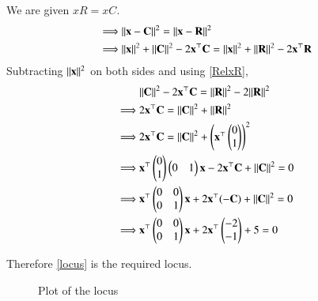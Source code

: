 \documentclass[journal,12pt,twocolumn]{IEEEtran}
\begin{document}
We are given $xR = xC$.  
\begin{align}
    \implies &\lVert\mathbf{x} - \mathbf{C}\rVert^2 = \lVert\mathbf{x} - \mathbf{R}\rVert^2\\ 
    \implies &\lVert\mathbf{x}\rVert^2+\lVert\mathbf{C}\rVert^2-2\mathbf{x}^\top \mathbf{C} = \lVert\mathbf{x}\rVert^2+\lVert\mathbf{R}\rVert^2-2\mathbf{x}^\top \mathbf{R}
\end{align}
Subtracting $\lVert\mathbf{x}\rVert^2$ on both sides and using \ref{RelxR},
\begin{align}
    &\lVert\mathbf{C}\rVert^2-2\mathbf{x}^\top \mathbf{C} = \lVert\mathbf{R}\rVert^2 - 2\lVert\mathbf{R}\rVert^2\\
    \implies &2\mathbf{x}^\top \mathbf{C} = \lVert\mathbf{C}\rVert^2+\lVert\mathbf{R}\rVert^2\\
    \implies &2\mathbf{x}^\top \mathbf{C} = \lVert\mathbf{C}\rVert^2+\begin{pmatrix}\mathbf{x}^\top \begin{pmatrix}0\\1\end{pmatrix}\end{pmatrix}^2\\
    \implies &\mathbf{x}^\top \begin{pmatrix}0\\1\end{pmatrix} \begin{pmatrix}0 & 1\end{pmatrix} \mathbf{x} - 2\mathbf{x}^\top \mathbf{C} + \lVert\mathbf{C}\rVert^2 = 0\\
    \implies &\mathbf{x}^\top \begin{pmatrix}0&0\\0&1\end{pmatrix}\mathbf{x} + 2\mathbf{x}^\top(- \mathbf{C}) + \lVert\mathbf{C}\rVert^2 = 0\\
    \implies &\mathbf{x}^\top \begin{pmatrix}0&0\\0&1\end{pmatrix}\mathbf{x} + 2\mathbf{x}^\top\begin{pmatrix}-2\\-1\end{pmatrix} + 5 = 0\label{locus}
\end{align}

Therefore \ref{locus} is the required locus. 
\begin{figure}
    \centering
    \caption{Plot of the locus}
\end{figure}
\end{document}
